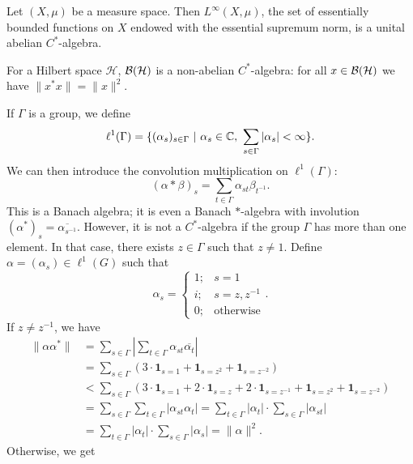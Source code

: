 \begin{example}
  Let $(X, \mu)$ be a measure space.
  Then $L^\infty (X, \mu)$, the set of essentially bounded functions on $X$ endowed with the essential supremum norm, is a unital abelian $C^*$-algebra.
\end{example}

\begin{example}
  For a Hilbert space $\mathcal{H}$, $\operatorname{\mathcal{B} (\mathcal{H})}$ is a non-abelian $C^*$-algebra:
  for all $x \in \operatorname{\mathcal{B} (\mathcal{H})}$ we have $\| x^* x\| = \|x\|^2$.
\end{example}

\begin{example}
  If $\Gamma$ is a group, we define 
  $$\ell^1 (\Gamma) = \{(\alpha_s)_{s \in \Gamma}\ |\ \alpha_s \in \mathbb {C},\ \sum_{s \in \Gamma} |\alpha_s| < \infty\}.$$
  We can then introduce the convolution multiplication on $\ell^1 (\Gamma)$:
  $$(\alpha * \beta)_s = \sum_{t \in \Gamma} \alpha_{st} \beta_{t^{-1}}.$$
  This is a Banach algebra; it is even a Banach $*$-algebra with involution 
  $(\alpha^*)_s = \overline{\alpha_{s^{-1}}}$. However, it is not a $ C^*$-algebra if the group $\Gamma$ has more than one element. 
  In that case, there exists $z \in \Gamma$ such that $z \neq 1$. Define $\alpha = (\alpha_s) \in \ell^1 (G)$ such that
  $$\alpha_s = \begin{cases}
    1; & s = 1\\
    i; & s = z, z^{-1}\\
    0; &  \textrm{otherwise}
  \end{cases}.$$
  If $z \neq z^{-1}$, we have
  \begin{align*}
    \|\alpha \alpha^*\| &= \sum_{s \in \Gamma} \left| \sum_{t \in \Gamma} \alpha_{st} \overline{\alpha_{t}} \right|\\
    &= \sum_{s \in \Gamma} (3 \cdot \mathbf{1}_{s = 1} + \mathbf{1}_{s = z^2} + \mathbf{1}_{s = z^{-2}})\\
    &< \sum_{s \in \Gamma} (3 \cdot \mathbf{1}_{s = 1} + 2\cdot \mathbf{1}_{s = z} + 2\cdot \mathbf{1}_{s = z^{-1}} + \mathbf{1}_{s = z^2} + \mathbf{1}_{s = z^{-2}})\\
    &= \sum_{s \in \Gamma} \sum_{t \in \Gamma} \left| \alpha_{st} {\alpha_{t}} \right| = \sum_{t \in \Gamma}|{\alpha_{t}}| \cdot \sum_{s \in \Gamma}  \left| \alpha_{st}  \right|\\
    &= \sum_{t \in \Gamma} \left|  {\alpha_{t}} \right| \cdot \sum_{s \in \Gamma} |\alpha_{s}| = \| \alpha\|^2.
  \end{align*}
  Otherwise, we get 
  \begin{align*}

\end{align*}
\end{example}
